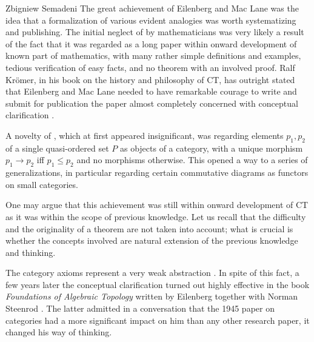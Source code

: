 \begin{artengenv}{Zbigniew Semadeni}
The great achievement of Eilenberg and Mac Lane was the idea that a formalization of 
various evident analogies was worth systematizing and publishing. The initial neglect 
of \parencite{E-ML} by mathematicians was very likely a result of the fact that it was 
regarded as a long paper within onward development of known part of mathematics, with 
many rather simple definitions and examples, tedious verification of easy facts, 
and no theorem with an involved proof. Ralf Kr{\"o}mer, in his book on the history 
and philosophy of CT, has outright stated that Eilenberg and Mac Lane needed to 
have remarkable courage to write and submit for publication the paper almost 
completely concerned with conceptual clarification \parencite[p.65]{Kromer}. 

A novelty of \parencite[p.272]{E-ML}, which at first appeared insignificant, was regarding 
elements $p_1, p_2$ of a single quasi-ordered set $P$ as objects of a category, 
with a unique morphism $p_1 \to p_2$ iff $p_1 \le p_2$ and no morphisms otherwise. 
This opened a way to a series of generalizations, in particular regarding certain 
commutative diagrams as functors on small categories. 

One may argue that this achievement was still within onward development of CT 
as it was within the scope of previous knowledge. Let us recall that the 
difficulty and the originality of a theorem are not taken into account; what is 
crucial is whether the concepts involved are natural extension of the previous 
knowledge and thinking. 

The category axioms represent a very weak abstraction \parencite[p.25]{Goldblatt}. 
In spite of this fact, a few years later the conceptual clarification turned out 
highly effective in the book \textit{Foundations of Algebraic Topology} written 
by Eilenberg together with Norman Steenrod \parencite*{Steenrod}. The latter admitted in a 
conversation that the 1945 paper on categories had a more significant impact on 
him than any other research paper, it changed his way of thinking. 


\end{artengenv}
